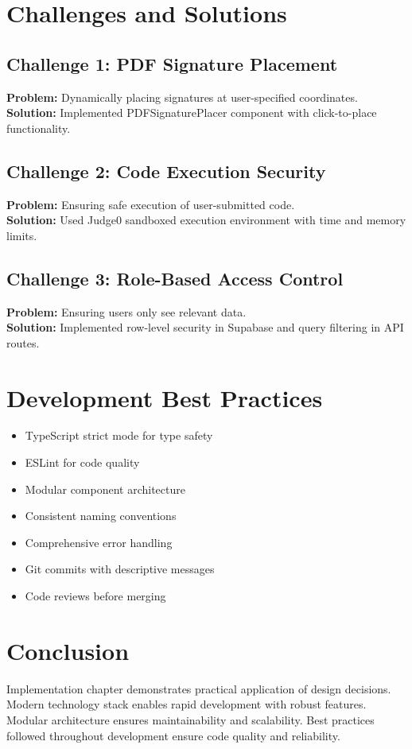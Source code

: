 \section{Challenges and Solutions}

\subsection{Challenge 1: PDF Signature Placement}
\textbf{Problem:} Dynamically placing signatures at user-specified coordinates.\\
\textbf{Solution:} Implemented PDFSignaturePlacer component with click-to-place functionality.

\subsection{Challenge 2: Code Execution Security}
\textbf{Problem:} Ensuring safe execution of user-submitted code.\\
\textbf{Solution:} Used Judge0 sandboxed execution environment with time and memory limits.

\subsection{Challenge 3: Role-Based Access Control}
\textbf{Problem:} Ensuring users only see relevant data.\\
\textbf{Solution:} Implemented row-level security in Supabase and query filtering in API routes.

\section{Development Best Practices}

\begin{itemize}
\item TypeScript strict mode for type safety
\item ESLint for code quality
\item Modular component architecture
\item Consistent naming conventions
\item Comprehensive error handling
\item Git commits with descriptive messages
\item Code reviews before merging
\end{itemize}

\section{Conclusion}

Implementation chapter demonstrates practical application of design decisions. Modern technology stack enables rapid development with robust features. Modular architecture ensures maintainability and scalability. Best practices followed throughout development ensure code quality and reliability.

\newpage
